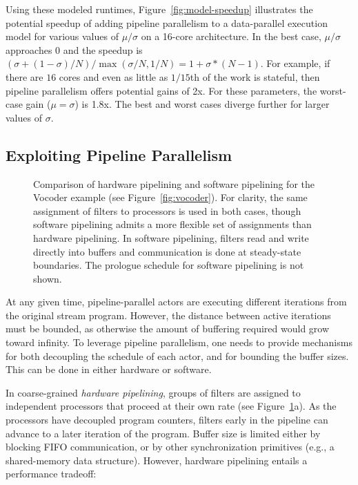 Using these modeled runtimes, Figure~\ref{fig:model-speedup}
illustrates the potential speedup of adding pipeline parallelism to a
data-parallel execution model for various values of $\mu/\sigma$ on a
16-core architecture.  In the best case, $\mu/\sigma$ approaches $0$
and the speedup is $(\sigma+(1-\sigma)/N)/\max(\sigma/N, 1/N) =
1+\sigma*(N-1)$.  For example, if there are $16$ cores and even as
little as $1/15$th of the work is stateful, then pipeline parallelism
offers potential gains of 2x.  For these parameters, the worst-case
gain ($\mu=\sigma$) is 1.8x.  The best and worst cases diverge further
for larger values of $\sigma$.

\subsection{Exploiting Pipeline Parallelism}

\begin{figure*}[t]
\begin{center}
\vspace{-6pt}
\end{center}

\caption{Comparison of hardware pipelining and software pipelining for
the Vocoder example (see Figure~\ref{fig:vocoder}).  For clarity, the
same assignment of filters to processors is used in both cases, though
software pipelining admits a more flexible set of assignments than
hardware pipelining.  In software pipelining, filters read and write
directly into buffers and communication is done at steady-state
boundaries.  The prologue schedule for software pipelining is not
shown.
\protect\label{fig:pipelining}}
\vspace{-8pt}
\end{figure*}

At any given time, pipeline-parallel actors are executing different
iterations from the original stream program.  However, the distance
between active iterations must be bounded, as otherwise the amount of
buffering required would grow toward infinity.  To leverage pipeline
parallelism, one needs to provide mechanisms for both decoupling the
schedule of each actor, and for bounding the buffer sizes.  This can
be done in either hardware or software.

In coarse-grained {\it hardware pipelining}, groups of filters are
assigned to independent processors that proceed at their own rate (see
Figure~\ref{fig:pipelining}a).  As the processors have decoupled
program counters, filters early in the pipeline can advance to a later
iteration of the program.  Buffer size is limited either by blocking
FIFO communication, or by other synchronization primitives (e.g., a
shared-memory data structure).  However, hardware pipelining entails a
performance tradeoff:

